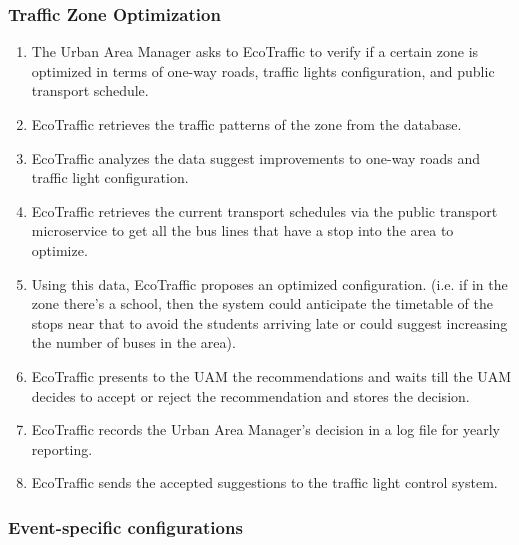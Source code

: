\documentclass[12pt, a4paper, twoside, openright]{report}
\begin{document}
\subsubsection{Traffic Zone Optimization}\label{subsubsec:traffic-zone}

\begin{enumerate}
\item
  The Urban Area Manager asks to EcoTraffic to verify if a certain zone
  is optimized in terms of one-way roads, traffic lights configuration,
  and public transport schedule.
\item
  EcoTraffic retrieves the traffic patterns of the
  zone from the database.
\item
  EcoTraffic analyzes the data suggest improvements to one-way roads and traffic light configuration.
\item
  EcoTraffic retrieves the current transport schedules via the public transport microservice
  to get all the bus lines that have a stop
  into the area to optimize.
\item
  Using this data, EcoTraffic proposes an optimized configuration. (i.e.
  if in the zone there's a school, then the system could anticipate the
  timetable of the stops near that to avoid the students arriving late
  or could suggest increasing the number of buses in the area).
\item
  EcoTraffic presents to the UAM the recommendations and waits till the
  UAM decides to accept or reject the recommendation and stores the
  decision.
\item
  EcoTraffic records the Urban Area Manager's decision in a log file for yearly reporting.
\item
  EcoTraffic sends the accepted suggestions to the traffic light control system.
\end{enumerate}

\subsubsection{Event-specific configurations}\label{subsubsec:event-specific}
\end{document}
